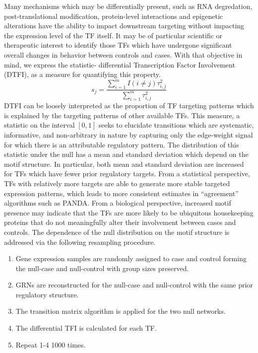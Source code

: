 \documentclass[english]{article}
\begin{document}
Many mechanisms which may be differentially present, such as RNA degredation,
post-translational modification, protein-level interactions and epigenetic
alterations have the ability to impact downstream targeting without
impacting the expression level of the TF itself. It may be of particular
scientific or therapeutic interest to identify those TFs which have
undergone significant overall changes in behavior between controls
and cases. With that objective in mind, we express the statistic-
differential Transcription Factor Involvement (DTFI), as a measure
for quantifying this property. 
\[
s_{j}=\frac{\sum_{i=1}^{m}I\left(i\ne j\right)\tau_{i,j}^{2}}{\sum_{i=1}^{m}\tau_{i,j}^{2}}
\]
 DTFI can be loosely interpreted as the proportion of TF targeting
patterns which is explained by the targeting patterns of other available
TFs. This measure, a statistic on the interval $[0,1]$ seeks to elucidate
transitions which are systematic, informative, and non-arbitrary in
nature by capturing only the edge-weight signal for which there is
an attributable regulatory pattern. The distribution of this statistic
under the null has a mean and standard deviation which depend on the
motif structure. In particular, both mean and standard deviation are
increased for TFs which have fewer prior regulatory targets. From
a statistical perspective, TFs with relatively more targets are able
to generate more stable targeted expression patterns, which leads
to more consistent estimates in “agreement” algorithms such as PANDA.
From a biological perspective, increased motif presence may indicate
that the TFs are more likely to be ubiquitous housekeeping proteins
that do not meaningfully alter their involvement between cases and
controls. The dependence of the null distribution on the motif structure
is addressed via the following resampling procedure. 
\begin{enumerate}
\item Gene expression samples are randomly assigned to case and control
forming the null-case and null-control with group sizes preserved. 
\item GRNs are reconstructed for the null-case and null-control with the
same prior regulatory structure. 
\item The transition matrix algorithm is applied for the two null networks. 
\item The differential TFI is calculated for each TF. 
\item Repeat 1-4 1000 times. 
\end{enumerate}
\end{document}
